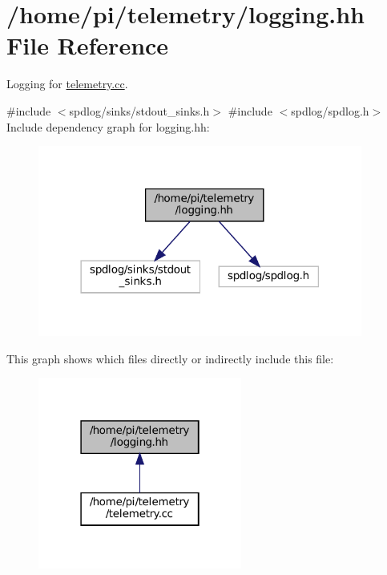 \hypertarget{logging_8hh}{}\section{/home/pi/telemetry/logging.hh File Reference}
\label{logging_8hh}


Logging for \hyperlink{telemetry_8cc}{telemetry.\+cc}.  


{\ttfamily \#include $<$spdlog/sinks/stdout\+\_\+sinks.\+h$>$}\newline
{\ttfamily \#include $<$spdlog/spdlog.\+h$>$}\newline
Include dependency graph for logging.\+hh\+:\nopagebreak
\begin{figure}[H]
\begin{center}
\leavevmode
\includegraphics[width=302pt]{logging_8hh__incl}
\end{center}
\end{figure}
This graph shows which files directly or indirectly include this file\+:
\nopagebreak
\begin{figure}[H]
\begin{center}
\leavevmode
\includegraphics[width=190pt]{logging_8hh__dep__incl}
\end{center}
\end{figure}
